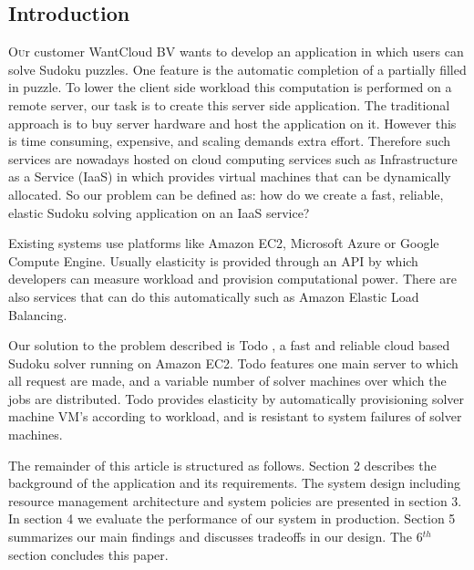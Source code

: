 \documentclass[twoside]{article}
\newcommand{\appName}{Todo }
\begin{document}
\begin{multicols}{2} %

\section{Introduction}

\lettrine[nindent=0em,lines=3]{O}ur customer WantCloud BV wants to develop an application in which users can solve Sudoku puzzles. One feature is the automatic completion of a partially filled in puzzle. To lower the client side workload this computation is performed on a remote server, our task is to create this server side application. The traditional approach is to buy server hardware and host the application on it. However this is time consuming, expensive, and scaling demands extra effort. Therefore such services are nowadays hosted on cloud computing services such as Infrastructure as a Service (IaaS) in which provides virtual machines that can be dynamically allocated. So our problem can be defined as: how do we create a fast, reliable, elastic Sudoku solving application on an IaaS service?

Existing systems use platforms like Amazon EC2\cite{ec2}, Microsoft Azure\cite{azure} or Google Compute Engine\cite{google}. Usually elasticity is provided through an API by which developers can measure workload and provision computational power. There are also services that can do this automatically such as Amazon Elastic Load Balancing. 

Our solution to the problem described is \appName, a fast and reliable cloud based Sudoku solver running on Amazon EC2\cite{ec2}. 
\appName features one main server to which all request are made, and a variable number of solver machines over which the jobs are distributed. \appName provides elasticity by automatically provisioning solver machine VM's according to workload, and is resistant to system failures of solver machines.

The remainder of this article is structured as follows. Section 2 describes the background of the application and its requirements. The system design including resource management architecture and system policies are presented in section 3. In section 4 we evaluate the performance of our system in production. Section 5 summarizes our main findings and discusses tradeoffs in our design. The 6$^{th}$ section concludes this paper. 



\end{multicols}
\end{document}
